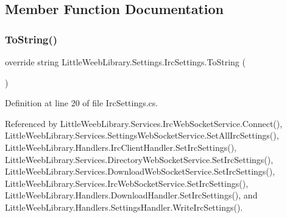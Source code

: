 \subsection{Member Function Documentation}
\mbox{\label{class_little_weeb_library_1_1_settings_1_1_irc_settings_a2e1d7f26d7d3083d19c3a9e6c6c2d0b2}} 
\subsubsection{\texorpdfstring{To\+String()}{ToString()}}
{\footnotesize\ttfamily override string Little\+Weeb\+Library.\+Settings.\+Irc\+Settings.\+To\+String (\begin{DoxyParamCaption}{ }\end{DoxyParamCaption})}



Definition at line 20 of file Irc\+Settings.\+cs.



Referenced by Little\+Weeb\+Library.\+Services.\+Irc\+Web\+Socket\+Service.\+Connect(), Little\+Weeb\+Library.\+Services.\+Settings\+Web\+Socket\+Service.\+Set\+All\+Irc\+Settings(), Little\+Weeb\+Library.\+Handlers.\+Irc\+Client\+Handler.\+Set\+Irc\+Settings(), Little\+Weeb\+Library.\+Services.\+Directory\+Web\+Socket\+Service.\+Set\+Irc\+Settings(), Little\+Weeb\+Library.\+Services.\+Download\+Web\+Socket\+Service.\+Set\+Irc\+Settings(), Little\+Weeb\+Library.\+Services.\+Irc\+Web\+Socket\+Service.\+Set\+Irc\+Settings(), Little\+Weeb\+Library.\+Handlers.\+Download\+Handler.\+Set\+Irc\+Settings(), and Little\+Weeb\+Library.\+Handlers.\+Settings\+Handler.\+Write\+Irc\+Settings().


